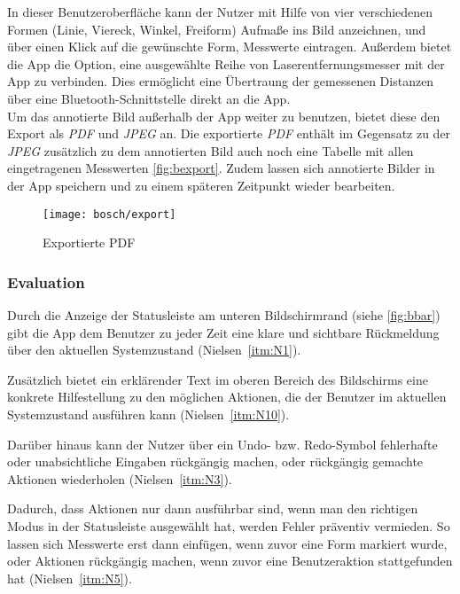 In dieser Benutzeroberfläche kann der Nutzer mit Hilfe von vier verschiedenen Formen (Linie, Viereck, Winkel, Freiform) Aufmaße ins Bild anzeichnen, und über einen Klick auf die gewünschte Form, Messwerte eintragen.
Außerdem bietet die App die Option, eine ausgewählte Reihe von Laserentfernungsmesser mit der App zu verbinden.
Dies ermöglicht eine Übertraung der gemessenen Distanzen über eine Bluetooth-Schnittstelle direkt an die App. \\

Um das annotierte Bild außerhalb der App weiter zu benutzen, bietet diese den Export als \emph{PDF} und \emph{JPEG} an.
Die exportierte \emph{PDF} enthält im Gegensatz zu der \emph{JPEG} zusätzlich zu dem annotierten Bild auch noch eine Tabelle mit allen eingetragenen Messwerten \autoref{fig:bexport}. 
Zudem lassen sich annotierte Bilder in der App speichern und zu einem späteren Zeitpunkt wieder bearbeiten.

\begin{figure}[h]
  \centering
  \texttt{[image: bosch/export]}
  \caption{Exportierte PDF}\label{fig:bexport}
\end{figure}

\subsubsection{Evaluation}

Durch die Anzeige der Statusleiste am unteren Bildschirmrand (siehe \autoref{fig:bbar}) gibt die App dem Benutzer zu jeder Zeit eine klare und sichtbare Rückmeldung über den aktuellen Systemzustand (Nielsen~\autoref{itm:N1}).

Zusätzlich bietet ein erklärender Text im oberen Bereich des Bildschirms eine konkrete Hilfestellung zu den möglichen Aktionen, die der Benutzer im aktuellen Systemzustand ausführen kann (Nielsen~\autoref{itm:N10}).

Darüber hinaus kann der Nutzer über ein Undo- bzw. Redo-Symbol fehlerhafte oder unabsichtliche Eingaben rückgängig machen, oder rückgängig gemachte Aktionen wiederholen (Nielsen~\autoref{itm:N3}).

Dadurch, dass Aktionen nur dann ausführbar sind, wenn man den richtigen Modus in der Statusleiste ausgewählt hat, werden Fehler präventiv vermieden. So lassen sich Messwerte erst dann einfügen, wenn zuvor eine Form markiert wurde, oder Aktionen rückgängig machen, wenn zuvor eine Benutzeraktion stattgefunden hat (Nielsen~\autoref{itm:N5}).

